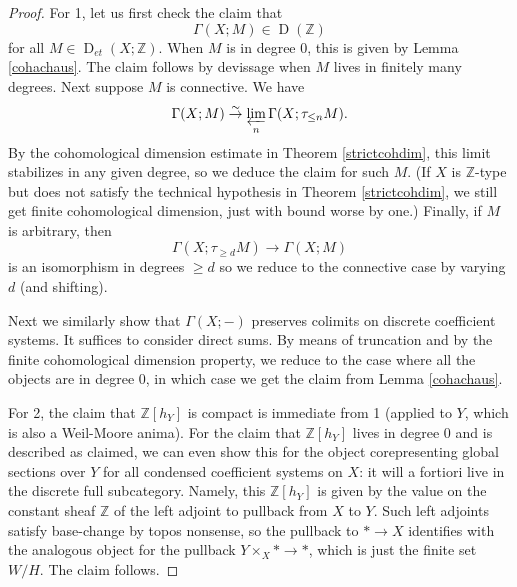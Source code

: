 \documentclass[12pt]{article}
\theoremstyle{definition}
\newcommand{\on}{\operatorname}
\newcommand{\mbb}{\mathbb}
\begin{document}
\begin{proof}
For 1, let us first check the claim that
$$\Gamma(X;M)\in\on{D}(\mbb{Z})$$
for all $M\in\on{D}_{et}(X;\mbb{Z})$.  When $M$ is in degree $0$, this is given by Lemma \ref{cohachaus}.  The claim follows by devissage when $M$ lives in finitely many degrees.  Next suppose $M$ is connective.  We have
$$\Gamma(X;M)\overset{\sim}{\rightarrow} \varprojlim_n \Gamma(X;\tau_{\leq n}M).$$
By the cohomological dimension estimate in Theorem \ref{strictcohdim}, this limit stabilizes in any given degree, so we deduce the claim for such $M$. (If $X$ is $\mbb{Z}$-type but does not satisfy the technical hypothesis in Theorem \ref{strictcohdim}, we still get finite cohomological dimension, just with bound worse by one.)  Finally, if $M$ is arbitrary, then
$$\Gamma(X;\tau_{\geq d}M)\to\Gamma(X;M)$$
is an isomorphism in degrees $\geq d$ so we reduce to the connective case by varying $d$ (and shifting).

Next we similarly show that $\Gamma(X;-)$ preserves colimits on discrete coefficient systems.  It suffices to consider direct sums.   By means of truncation and by the finite cohomological dimension property, we reduce to the case where all the objects are in degree $0$, in which case we get the claim from Lemma \ref{cohachaus}.

For 2, the claim that $\mbb{Z}[h_Y]$ is compact is immediate from 1 (applied to $Y$, which is also a Weil-Moore anima).  For the claim that $\mbb{Z}[h_Y]$ lives in degree $0$ and is described as claimed, we can even show this for the object corepresenting global sections over $Y$ for all condensed coefficient systems on $X$: it will a fortiori live in the discrete full subcategory.  Namely, this $\mbb{Z}[h_Y]$ is given by the value on the constant sheaf $\mbb{Z}$ of the left adjoint to pullback from $X$ to $Y$.  Such left adjoints satisfy base-change by topos nonsense, so the pullback to $\ast \to X$ identifies with the analogous object for the pullback $Y\times_X\ast \to \ast$, which is just the finite set $W/H$.  The claim follows.


\end{proof}
\end{document}
